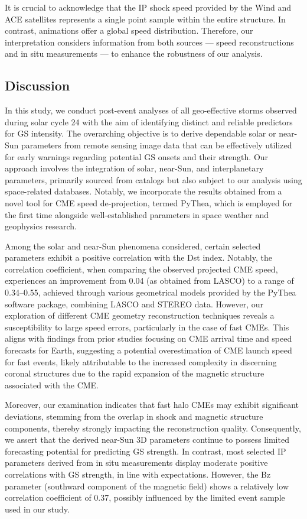 It is crucial to acknowledge that the IP shock speed provided by the Wind and ACE satellites represents a single point sample within the entire structure. In contrast, animations offer a global speed distribution. Therefore, our interpretation considers information from both sources — speed reconstructions and in situ measurements — to enhance the robustness of our analysis.

\subsection{Discussion}
In this study, we conduct post-event analyses of all geo-effective storms observed during solar cycle 24 with the aim of identifying distinct and reliable predictors for GS intensity. The overarching objective is to derive dependable solar or near-Sun parameters from remote sensing image data that can be effectively utilized for early warnings regarding potential GS onsets and their strength. Our approach involves the integration of solar, near-Sun, and interplanetary parameters, primarily sourced from catalogs but also subject to our analysis using space-related databases. Notably, we incorporate the results obtained from a novel tool for CME speed de-projection, termed PyThea, which is employed for the first time alongside well-established parameters in space weather and geophysics research.

Among the solar and near-Sun phenomena considered, certain selected parameters exhibit a positive correlation with the Dst index. Notably, the correlation coefficient, when comparing the observed projected CME speed, experiences an improvement from 0.04 (as obtained from LASCO) to a range of 0.34–0.55, achieved through various geometrical models provided by the PyThea software package, combining LASCO and STEREO data. However, our exploration of different CME geometry reconstruction techniques reveals a susceptibility to large speed errors, particularly in the case of fast CMEs. This aligns with findings from prior studies focusing on CME arrival time and speed forecasts for Earth, suggesting a potential overestimation of CME launch speed for fast events, likely attributable to the increased complexity in discerning coronal structures due to the rapid expansion of the magnetic structure associated with the CME.

Moreover, our examination indicates that fast halo CMEs may exhibit significant deviations, stemming from the overlap in shock and magnetic structure components, thereby strongly impacting the reconstruction quality. Consequently, we assert that the derived near-Sun 3D parameters continue to possess limited forecasting potential for predicting GS strength. In contrast, most selected IP parameters derived from in situ measurements display moderate positive correlations with GS strength, in line with expectations. However, the Bz parameter (southward component of the magnetic field) shows a relatively low correlation coefficient of 0.37, possibly influenced by the limited event sample used in our study.

